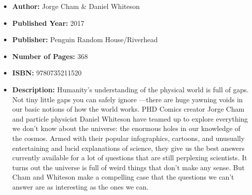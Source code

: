 \documentclass{tufte-handout}
\begin{document}
\begin{itemize}
    \item[] \textbf{Author:} Jorge Cham \& Daniel Whiteson 
    \item[] \textbf{Published Year:} 2017
    \item[] \textbf{Publisher:} Penguin Random House/Riverhead
    \item[] \textbf{Number of Pages:} 368      
    \item[] \textbf{ISBN:} 9780735211520
    \item[] \textbf{Description:} Humanity’s understanding of the physical world is full of gaps. Not tiny little gaps you can safely ignore —there are huge yawning voids in our basic notions of how the world works. PHD Comics creator Jorge Cham and particle physicist Daniel Whiteson have teamed up to explore everything we don’t know about the universe: the enormous holes in our knowledge of the cosmos. Armed with their popular infographics, cartoons, and unusually entertaining and lucid explanations of science, they give us the best answers currently available for a lot of questions that are still perplexing scientists. It turns out the universe is full of weird things that don’t make any sense. But Cham and Whiteson make a compelling case that the questions we can’t answer are as interesting as the ones we can.
\end{itemize}
\end{document}
